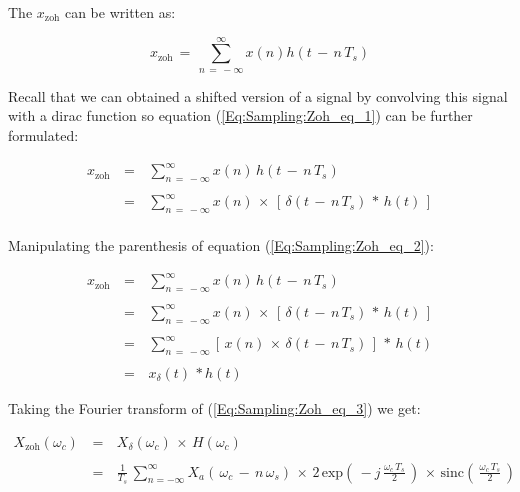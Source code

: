 The $x_{\text{zoh}}$ can be written as:

\begin{equation}
x_{\text{zoh}} \, = \, \displaystyle\sum\limits_{n \, = \, -\infty}^{\infty} x(n) h\left(	t \, - \, n\,T_s \right)
\label{Eq:Sampling:Zoh_eq_1}
\end{equation}

Recall that we can obtained a shifted version of a signal by convolving this signal with a dirac function so equation (\ref{Eq:Sampling:Zoh_eq_1}) can be further formulated:

\begin{equation}
\begin{array}{rcl}
x_{\text{zoh}} \, &=& \, \displaystyle\sum\limits_{n \, = \, -\infty}^{\infty} x(n) \, h\left(	t \, - \, n\,T_s \right) \\ \\		
&=& \, \displaystyle\sum\limits_{n \, = \, -\infty}^{\infty} x(n) \, \times \, \left[ \, \delta \left(	t \, - \, n\,T_s \right) \, * \, h(t) \, \right] \\ 
\end{array}
\label{Eq:Sampling:Zoh_eq_2}
\end{equation}


Manipulating the parenthesis of equation (\ref{Eq:Sampling:Zoh_eq_2}):

\begin{equation}
\begin{array}{rcl}
x_{\text{zoh}} \, &=& \, \displaystyle\sum\limits_{n \, = \, -\infty}^{\infty} x(n) \, h\left(	t \, - \, n\,T_s \right) \\ \\		
&=& \, \displaystyle\sum\limits_{n \, = \, -\infty}^{\infty} x(n) \, \times \, \left[ \, \delta \left(	t \, - \, n\,T_s \right) \, * \, h(t) \, \right] \\ \\
&=& \, \displaystyle\sum\limits_{n \, = \, -\infty}^{\infty} \left[\, x(n) \, \times  \, \delta \left(	t \, - \, n\,T_s \right) \, \right] \, * \, h(t)   \\ \\
&=& \,  x_{\delta}(t) \, * h(t)
\end{array}
\label{Eq:Sampling:Zoh_eq_3}
\end{equation}


Taking the Fourier transform of (\ref{Eq:Sampling:Zoh_eq_3}) we get:

\begin{equation}
\begin{array}{rcl}
X_{\text{zoh}}(\omega_c) \, &=& \, X_{\delta}(\omega_c) \, \times \, H(\omega_c) \\ \\
			 &=& \, \displaystyle\frac{1}{T_s} \, \displaystyle\sum\limits_{n  =  -\infty}^{\infty} X_a \left( \, \omega_c \, - \,  n \, \omega_s \right) \, \times \, 2 \, \text{exp}\left( \, -j \, \displaystyle\frac{\omega_c \, T_s}{2} \, \right) \, \times \, \text{sinc}\left(\, \displaystyle\frac{\omega_c \, T_s}{2} \,\right) 
\end{array}
\end{equation}

